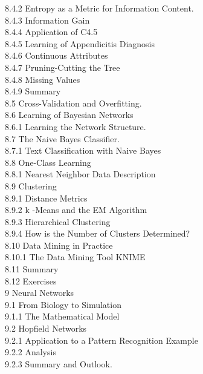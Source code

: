 \documentclass[10pt]{book}
\begin{document}
8.4.2 Entropy as a Metric for Information Content. \\
8.4.3 Information Gain \\
8.4.4 Application of C4.5 \\
8.4.5 Learning of Appendicitis Diagnosis \\
8.4.6 Continuous Attributes \\
8.4.7 Pruning-Cutting the Tree \\
8.4.8 Missing Values \\
8.4.9 Summary \\
8.5 Cross-Validation and Overfitting. \\
8.6 Learning of Bayesian Networks \\
8.6.1 Learning the Network Structure. \\
8.7 The Naive Bayes Classifier. \\
8.7.1 Text Classification with Naive Bayes \\
8.8 One-Class Learning \\
8.8.1 Nearest Neighbor Data Description \\
8.9 Clustering \\
8.9.1 Distance Metrics \\
8.9.2 k -Means and the EM Algorithm \\
8.9.3 Hierarchical Clustering \\
8.9.4 How is the Number of Clusters Determined? \\
8.10 Data Mining in Practice \\
8.10.1 The Data Mining Tool KNIME \\
8.11 Summary \\
8.12 Exercises \\
9 Neural Networks \\
9.1 From Biology to Simulation \\
9.1.1 The Mathematical Model \\
9.2 Hopfield Networks \\
9.2.1 Application to a Pattern Recognition Example \\
9.2.2 Analysis \\
9.2.3 Summary and Outlook. \\
\end{document}
